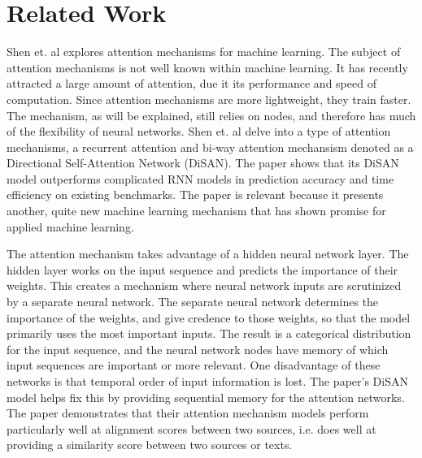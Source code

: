 \section{Related Work}

Shen et. al explores attention mechanisms for machine learning.  The subject of attention mechanisms is not well known within machine learning.  It has recently attracted a large amount of attention, due it its performance and speed of computation.  Since attention mechanisms are more lightweight, they train faster.  The mechanism, as will be explained, still relies on nodes, and therefore has much of the flexibility of neural networks.  Shen et. al delve into a type of attention mechanisms, a recurrent attention and bi-way attention mechansism denoted as a Directional Self-Attention Network (DiSAN).  The paper shows that its DiSAN model outperforms complicated RNN models in prediction accuracy and time efficiency on existing benchmarks.  The paper is relevant because it presents another, quite new machine learning mechanism that has shown promise for applied machine learning.

The attention mechanism takes advantage of a hidden neural network layer.  The hidden layer works on the input sequence and predicts the importance of their weights.  This creates a mechanism where neural network inputs are scrutinized by a separate neural network.  The separate neural network determines the importance of the weights, and give credence to those weights, so that the model primarily uses the most important inputs.  The result is a categorical distribution for the input sequence, and the neural network nodes have memory of which input sequences are important or more relevant.  One disadvantage of these networks is that temporal order of input information is lost.  The paper's DiSAN model helps fix this by providing sequential memory for the attention networks.  The paper demonstrates that their attention mechanism models perform particularly well at alignment scores between two sources, i.e. does well at providing a similarity score between two sources or texts.

